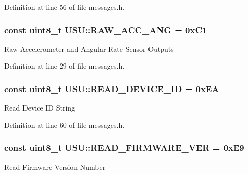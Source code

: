 \-Definition at line 56 of file messages.\-h.

\hypertarget{namespace_u_s_u_a6bbb473161195a7e10d9f821cece1b04}{
\subsubsection[{\-R\-A\-W\-\_\-\-A\-C\-C\-\_\-\-A\-N\-G}]{\setlength{\rightskip}{0pt plus 5cm}const uint8\-\_\-t {\bf \-U\-S\-U\-::\-R\-A\-W\-\_\-\-A\-C\-C\-\_\-\-A\-N\-G} = 0x\-C1}}\label{namespace_u_s_u_a6bbb473161195a7e10d9f821cece1b04}
\-Raw \-Accelerometer and \-Angular \-Rate \-Sensor \-Outputs 

\-Definition at line 29 of file messages.\-h.

\hypertarget{namespace_u_s_u_ad810b0281ab629302e9fd716374b90ed}{
\subsubsection[{\-R\-E\-A\-D\-\_\-\-D\-E\-V\-I\-C\-E\-\_\-\-I\-D}]{\setlength{\rightskip}{0pt plus 5cm}const uint8\-\_\-t {\bf \-U\-S\-U\-::\-R\-E\-A\-D\-\_\-\-D\-E\-V\-I\-C\-E\-\_\-\-I\-D} = 0x\-E\-A}}\label{namespace_u_s_u_ad810b0281ab629302e9fd716374b90ed}
\-Read \-Device \-I\-D \-String 

\-Definition at line 60 of file messages.\-h.

\hypertarget{namespace_u_s_u_a7d0e77d37d6107d2869c30f57412e8b0}{
\subsubsection[{\-R\-E\-A\-D\-\_\-\-F\-I\-R\-M\-W\-A\-R\-E\-\_\-\-V\-E\-R}]{\setlength{\rightskip}{0pt plus 5cm}const uint8\-\_\-t {\bf \-U\-S\-U\-::\-R\-E\-A\-D\-\_\-\-F\-I\-R\-M\-W\-A\-R\-E\-\_\-\-V\-E\-R} = 0x\-E9}}\label{namespace_u_s_u_a7d0e77d37d6107d2869c30f57412e8b0}
\-Read \-Firmware \-Version \-Number 

